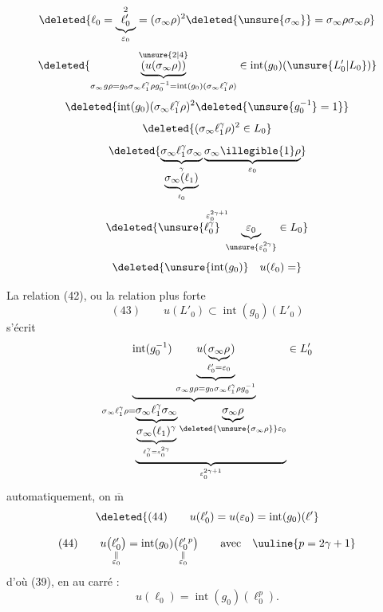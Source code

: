 \[
\deleted{\ell_0=\underbrace{\ell'_0}_{\varepsilon_0}^{2}=(\sigma_\infty\rho)^2\deleted{\unsure{\sigma_\infty}}=\sigma_\infty\rho\sigma_\infty\rho}
\]
\[
\deleted{\underbrace{(u(\sigma_\infty\rho))}_{
\substack{\sigma_\infty g\rho=g_0\sigma_\infty \ell_1^\gamma\rho g_0^{-1}
=\operatorname{int}(g_0)(\sigma_\infty \ell_1^\gamma\rho)}}^{\unsure{2|4}}
\in\operatorname{int}(g_0)(\unsure{L'_0|L_0})}
\]
\[
\deleted{\operatorname{int}(g_0)(\sigma_\infty \ell_1^\gamma\rho)^2\deleted{\unsure{g_0^{-1}}=1}}
\]
\[
\deleted{(\sigma_\infty \ell_1^\gamma\rho)^2\in L_0}
\]
\[
\deleted{
\underbrace{\sigma_\infty \ell_1^\gamma\sigma_\infty}_{
    \underbrace{\sigma_\infty(\ell_1)}_{\ell_0}^{\gamma}}
  \underbrace{\sigma_\infty\illegible{1}\rho}_{\varepsilon_0}
}
\]
\[
\deleted{\overset{\varepsilon_0^{2\gamma+1}}{\unsure{\ell_0^\gamma}\ \underbrace{\varepsilon_0}_{\unsure{\varepsilon_0^{2\gamma}}}}\in L_0}
\]
\[
\deleted{\unsure{\operatorname{int}(g_0)}\quad u(\ell_0)=}
\]

La relation (42), ou la relation  plus forte
\[
(43)\qquad u(L'_0)\subset\operatorname{int}(g_0)(L'_0)
\]
s'écrit
\[
\underbrace{\operatorname{int}(g_0^{-1})\,
\underbrace{u(\underbrace{\sigma_\infty\rho}_{\ell'_0=\varepsilon_0})}_{
\sigma_\infty g\rho=g_0\sigma_\infty \ell_1^\gamma\rho g_0^{-1}}}_{
\sigma_\infty \ell_1^\gamma\rho
=\underbrace{\underbrace{\sigma_\infty \ell_1^\gamma\sigma_\infty}_{
 \underbrace{\sigma_\infty(\ell_1)^\gamma}_{\ell_0^\gamma=\varepsilon_0^{2\gamma}}}
\underbrace{\sigma_\infty\rho}_{\deleted{\unsure{\sigma_\infty\rho}}\varepsilon_0}}_{
\varepsilon_0^{2\gamma+1}}}
\in L'_0
\]
 automatiquement, on 
$\overline{\mathrm m}$
\[
\deleted{(44)\qquad u(\ell'_0)=u(\varepsilon_0)
=\operatorname{int}(g_0)(\ell'}
\]


\[
(44)\qquad
u\bigl(\underset{\substack{\Vert\\ \varepsilon_0}}{\ell'_0}\bigr)
 = \operatorname{int}(g_0)\bigl(\underset{\substack{\Vert\\ \varepsilon_0}}{\ell'_0}{}^{p}\bigr)
\qquad \text{avec}\quad \uuline{p=2\gamma+1}
\]
d'où (39),  en  au carré :
\[
u(\ell_0)=\operatorname{int}(g_0)(\ell_0^p).
\]

